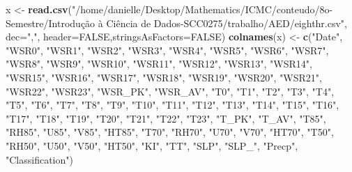 \documentclass[]{article}
\newenvironment{Shaded}{\begin{snugshade}}{\end{snugshade}}
\newcommand{\KeywordTok}[1]{\textcolor[rgb]{0.13,0.29,0.53}{\textbf{#1}}}
\newcommand{\DataTypeTok}[1]{\textcolor[rgb]{0.13,0.29,0.53}{#1}}
\newcommand{\StringTok}[1]{\textcolor[rgb]{0.31,0.60,0.02}{#1}}
\newcommand{\OtherTok}[1]{\textcolor[rgb]{0.56,0.35,0.01}{#1}}
\newcommand{\NormalTok}[1]{#1}
\begin{document}
\begin{Shaded}
\begin{Highlighting}[]
\NormalTok{x <-}\StringTok{ }\KeywordTok{read.csv}\NormalTok{(}\StringTok{"/home/danielle/Desktop/Mathematics/ICMC/conteudo/8o-Semestre/Introdução à Ciência de Dados-SCC0275/trabalho/AED/eighthr.csv"}\NormalTok{, }\DataTypeTok{dec=}\StringTok{","}\NormalTok{, }\DataTypeTok{header=}\OtherTok{FALSE}\NormalTok{,}\DataTypeTok{stringsAsFactors=}\OtherTok{FALSE}\NormalTok{) }
\KeywordTok{colnames}\NormalTok{(x) <-}\StringTok{ }\KeywordTok{c}\NormalTok{(}\StringTok{"Date"}\NormalTok{, }\StringTok{"WSR0"}\NormalTok{, }\StringTok{"WSR1"}\NormalTok{, }\StringTok{"WSR2"}\NormalTok{, }\StringTok{"WSR3"}\NormalTok{, }\StringTok{"WSR4"}\NormalTok{, }\StringTok{"WSR5"}\NormalTok{, }\StringTok{"WSR6"}\NormalTok{, }\StringTok{"WSR7"}\NormalTok{, }\StringTok{"WSR8"}\NormalTok{, }\StringTok{"WSR9"}\NormalTok{, }\StringTok{"WSR10"}\NormalTok{, }\StringTok{"WSR11"}\NormalTok{, }\StringTok{"WSR12"}\NormalTok{, }\StringTok{"WSR13"}\NormalTok{, }\StringTok{"WSR14"}\NormalTok{, }\StringTok{"WSR15"}\NormalTok{, }\StringTok{"WSR16"}\NormalTok{, }\StringTok{"WSR17"}\NormalTok{, }\StringTok{"WSR18"}\NormalTok{, }\StringTok{"WSR19"}\NormalTok{, }\StringTok{"WSR20"}\NormalTok{, }\StringTok{"WSR21"}\NormalTok{, }\StringTok{"WSR22"}\NormalTok{, }\StringTok{"WSR23"}\NormalTok{, }\StringTok{"WSR_PK"}\NormalTok{, }\StringTok{"WSR_AV"}\NormalTok{, }\StringTok{"T0"}\NormalTok{, }\StringTok{"T1"}\NormalTok{, }\StringTok{"T2"}\NormalTok{, }\StringTok{"T3"}\NormalTok{, }\StringTok{"T4"}\NormalTok{, }\StringTok{"T5"}\NormalTok{, }\StringTok{"T6"}\NormalTok{, }\StringTok{"T7"}\NormalTok{, }\StringTok{"T8"}\NormalTok{, }\StringTok{"T9"}\NormalTok{, }\StringTok{"T10"}\NormalTok{, }\StringTok{"T11"}\NormalTok{, }\StringTok{"T12"}\NormalTok{, }\StringTok{"T13"}\NormalTok{, }\StringTok{"T14"}\NormalTok{, }\StringTok{"T15"}\NormalTok{, }\StringTok{"T16"}\NormalTok{, }\StringTok{"T17"}\NormalTok{, }\StringTok{"T18"}\NormalTok{, }\StringTok{"T19"}\NormalTok{, }\StringTok{"T20"}\NormalTok{, }\StringTok{"T21"}\NormalTok{, }\StringTok{"T22"}\NormalTok{, }\StringTok{"T23"}\NormalTok{, }\StringTok{"T_PK"}\NormalTok{, }\StringTok{"T_AV"}\NormalTok{, }\StringTok{"T85"}\NormalTok{, }\StringTok{"RH85"}\NormalTok{, }\StringTok{"U85"}\NormalTok{, }\StringTok{"V85"}\NormalTok{, }\StringTok{"HT85"}\NormalTok{, }\StringTok{"T70"}\NormalTok{, }\StringTok{"RH70"}\NormalTok{, }\StringTok{"U70"}\NormalTok{, }\StringTok{"V70"}\NormalTok{, }\StringTok{"HT70"}\NormalTok{, }\StringTok{"T50"}\NormalTok{, }\StringTok{"RH50"}\NormalTok{, }\StringTok{"U50"}\NormalTok{, }\StringTok{"V50"}\NormalTok{, }\StringTok{"HT50"}\NormalTok{, }\StringTok{"KI"}\NormalTok{, }\StringTok{"TT"}\NormalTok{, }\StringTok{"SLP"}\NormalTok{, }\StringTok{"SLP_"}\NormalTok{, }\StringTok{"Precp"}\NormalTok{, }\StringTok{"Classification"}\NormalTok{)}
\end{Highlighting}
\end{Shaded}
\end{document}
